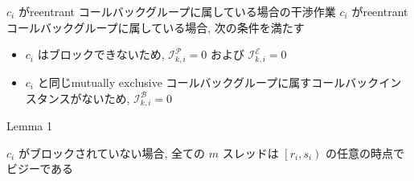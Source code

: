 \begin{frame}{$c_{i}$ がreentrant コールバックグループに属している場合の干渉作業}
    $c_{i}$ がreentrant コールバックグループに属している場合, 次の条件を満たす
    \begin{itemize}
        \item  $c_{i}$ はブロックできないため, $\mathcal{I}_{k, i}^{\mathcal{P}}=0$ および $\mathcal{I}_{k, i}^{\mathcal{E}}=0$

        \item  $c_{i}$ と同じmutually exclusive コールバックグループに属すコールバックインスタンスがないため, $\mathcal{I}_{k, i}^{\mathcal{B}}=0$
    \end{itemize}
\end{frame}

\begin{frame}{Lemma 1}
    \begin{lemma}[]
        $c_{i}$ がブロックされていない場合, 全ての $m$ スレッドは $\left[r_{i}, s_{i}\right)$ の任意の時点でビジーである
    \end{lemma}
\end{frame}





